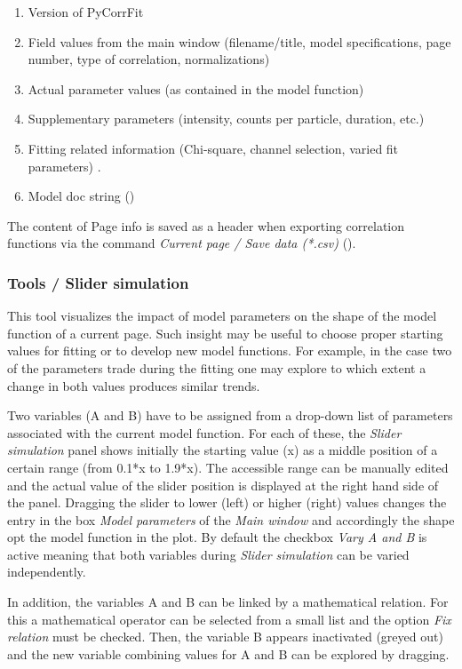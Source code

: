 \begin{enumerate}
\item Version of PyCorrFit
\item Field values from the main window (filename/title, model specifications, page number, type of correlation, normalizations)
\item Actual parameter values (as contained in the model function)
\item Supplementary parameters (intensity, counts per particle, duration, etc.)
\item Fitting related information (Chi-square, channel selection, varied fit parameters) .
\item Model doc string ()
\end{enumerate}
The content of Page info is saved as a header when exporting correlation functions via the command \textit{Current page / Save data (*.csv)} ().

\subsubsection{Tools / Slider simulation}
\label{sec:tm.ss}
This tool visualizes the impact of model parameters on the shape of the model function of a current page. Such insight may be useful to choose proper starting values for fitting or to develop new model functions. For example, in the case two of the parameters trade during the fitting one may explore to which extent a change in both values produces similar trends.

Two variables (A and B) have to be assigned from a drop-down list of parameters associated with the current model function. For each of these, the \textit{Slider simulation} panel shows initially the starting value (x) as a middle position of a certain range (from 0.1*x to 1.9*x). The accessible range can be manually edited and the actual value of the slider position is displayed at the right hand side of the panel. Dragging the slider to lower (left) or higher (right) values changes the entry in the box \textit{Model parameters} of the \textit{Main window} and accordingly the shape opt the model function in the plot. By default the checkbox \textit{Vary A and B}\textit{ }is active meaning that both variables during \textit{Slider simulation} can be varied independently. 

In addition, the variables A and B can be linked by a mathematical relation. For this a mathematical operator can be selected from a small list and the option \textit{Fix relation} must be checked. Then, the variable B appears inactivated (greyed out) and the new variable combining values for A and B can be explored by dragging.


